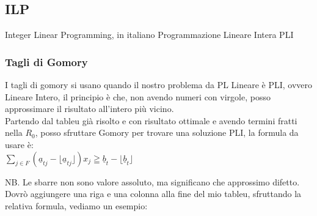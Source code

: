\documentclass{article}
\begin{document}
\begin{center}
\end{center}
\newpage
\subsection{ILP}
Integer Linear Programming, in italiano Programmazione Lineare Intera PLI
\subsubsection{Tagli di Gomory}
I tagli di gomory si usano quando il nostro problema da PL Lineare è PLI, ovvero Lineare Intero, il principio è che, non avendo numeri con virgole, posso approssimare il risultato all'intero più vicino.\\

Partendo dal tableu già risolto e con risultato ottimale e avendo termini fratti nella $R_0$, posso sfruttare Gomory per trovare una soluzione PLI, la formula da usare è:\\
$\displaystyle \sum_{j \in F} ( \underline{a}_{tj} - \lfloor \underline{a}_{tj} \rfloor )x_j \geqq \underline{b}_t -  \lfloor \underline{b}_t \rfloor$

NB. Le sbarre non sono valore assoluto, ma significano che approssimo difetto.\\
Dovrò aggiungere una riga e una colonna alla fine del mio tableu, sfruttando la relativa formula, vediamo un esempio:\\

\begin{center}
\end{center}
\end{document}
